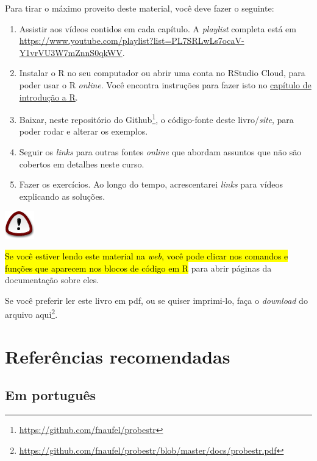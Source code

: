 \documentclass[
  11pt]{report}
\DeclareRobustCommand{\href}[2]{#2\footnote{\url{#1}}}
\newenvironment{rmdimportant}
{
  \begin{myimportant}
    \includegraphics{images/important.png}
    \tcblower
  }
  {
  \end{myimportant}
}
\begin{document}
Para tirar o máximo proveito deste material, você deve fazer o seguinte:

\begin{enumerate}
\def\labelenumi{\arabic{enumi}.}
\item
  Assistir aos vídeos contidos em cada capítulo. A \emph{playlist} completa está em \url{https://www.youtube.com/playlist?list=PL7SRLwLs7ocaV-Y1vrVU3W7mZnnS0qkWV}.
\item
  Instalar o R no seu computador ou abrir uma conta no RStudio Cloud, para poder usar o R \emph{online}. Você encontra instruções para fazer isto no \protect\hyperlink{rintro}{capítulo de introdução a R}.
\item
  Baixar, \href{https://github.com/fnaufel/probestr}{neste repositório do Github}, o código-fonte deste livro/\emph{site}, para poder rodar e alterar os exemplos.
\item
  Seguir os \emph{links} para outras fontes \emph{online} que abordam assuntos que não são cobertos em detalhes neste curso.
\item
  Fazer os exercícios. Ao longo do tempo, acrescentarei \emph{links} para vídeos explicando as soluções.
\end{enumerate}

\begin{rmdimportant}
{\hl{Se você estiver lendo este material na \emph{web}, você pode clicar nos comandos e funções que aparecem nos blocos de código em R}} para abrir páginas da documentação sobre eles.

Se você preferir ler este livro em pdf, ou se quiser imprimi-lo, \href{https://github.com/fnaufel/probestr/blob/master/docs/probestr.pdf}{faça o \emph{download} do arquivo aqui}.

\end{rmdimportant}

\hypertarget{refrec}{%
\section*{Referências recomendadas}\label{refrec}}

\hypertarget{em-portuguuxeas}{%
\subsection*{Em português}\label{em-portuguuxeas}}
\end{document}
